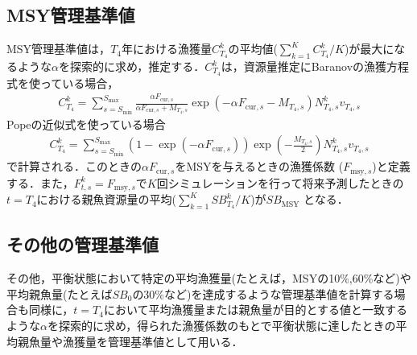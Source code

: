 \documentclass[11pt]{jsarticle}
\begin{document}
\subsection{MSY管理基準値}
MSY管理基準値は，$T_4$年における漁獲量$C_{T_4}^k$の平均値($\sum_{k=1}^K C_{T_4}^k / K$)が最大になるような$\alpha$を探索的に求め，推定する．$C_{T_4}^k$は，資源量推定にBaranovの漁獲方程式を使っている場合，
\begin{eqnarray}
  C_{T_4}^k=\sum_{s=S_{\mathrm{min}}}^{S_{\mathrm{max}}} \frac{\alpha F_{\mathrm{cur},s}}{\alpha F_{\mathrm{cur},s}+M_{T_4,s}}
  \exp(-\alpha F_{\mathrm{cur},s}-M_{T_4,s}) N_{T_4,s}^k v_{T_4,s}
\end{eqnarray}
Popeの近似式を使っている場合
\begin{eqnarray}
  C_{T_4}^k=\sum_{s=S_{\mathrm{min}}}^{S_{\mathrm{max}}} (1-\exp(-\alpha F_{\mathrm{cur},s})) \exp(-\frac{M_{T_4, s}}{2})N_{T_4,s}^k v_{T_4,s} 
\end{eqnarray}
で計算される．このときの$\alpha F_{\mathrm{cur},s}$をMSYを与えるときの漁獲係数 ($F_{\mathrm{msy},s}$)と定義する．また，$F_{t,s}^k=F_{\mathrm{msy},s}$で$K$回シミュレーションを行って将来予測したときの$t=T_4$における親魚資源量の平均($\sum_{k=1}^K S\!B_{T_4}^k /K$)が$S\!B_{\mathrm{MSY}}$ となる．

\subsection{その他の管理基準値}
その他，平衡状態において特定の平均漁獲量(たとえば，MSYの10\%,60\%など)や平均親魚量(たとえば$S\!B_0$の30\%など)を達成するような管理基準値を計算する場合も同様に，$t=T_4$において平均漁獲量または親魚量が目的とする値と一致するような$\alpha$を探索的に求め，得られた漁獲係数のもとで平衡状態に達したときの平均親魚量や漁獲量を管理基準値として用いる．
\end{document}
